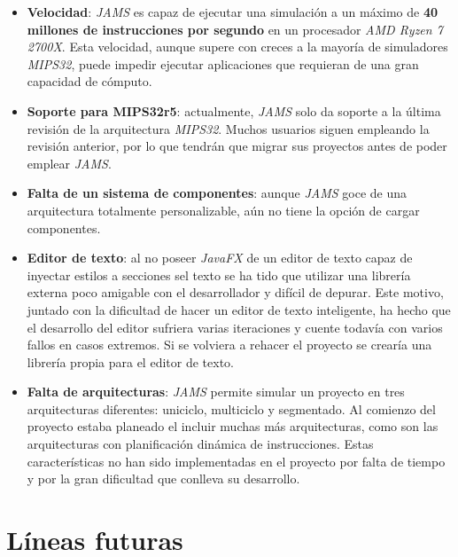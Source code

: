 \begin{itemize}
    \item \textbf{Velocidad}: \textit{JAMS} es capaz de ejecutar
    una simulación a un máximo de \textbf{40 millones de instrucciones por segundo} en un
    procesador \textit{AMD Ryzen 7 2700X}.
    Esta velocidad, aunque supere con creces a la mayoría de simuladores \textit{MIPS32},
    puede impedir ejecutar aplicaciones que requieran de una gran capacidad de cómputo.
    \item \textbf{Soporte para MIPS32r5}: actualmente, \textit{JAMS} solo da soporte
    a la última revisión de la arquitectura \textit{MIPS32}.
    Muchos usuarios siguen empleando la revisión anterior, por lo que tendrán que migrar
    sus proyectos antes de poder emplear \textit{JAMS}.
    \item \textbf{Falta de un sistema de componentes}: aunque \textit{JAMS}
    goce de una arquitectura totalmente personalizable,
    aún no tiene la opción de cargar componentes.
    \item \textbf{Editor de texto}: al no poseer \textit{JavaFX} de un editor
    de texto capaz de inyectar estilos a secciones sel texto se ha tido que
    utilizar una librería externa poco amigable con el desarrollador y difícil
    de depurar.
    Este motivo, juntado con la dificultad de hacer un editor de texto inteligente,
    ha hecho que el desarrollo del editor sufriera varias iteraciones y
    cuente todavía con varios fallos en casos extremos.
    Si se volviera a rehacer el proyecto se crearía una librería propia para
    el editor de texto.
    \item \textbf{Falta de arquitecturas}: \textit{JAMS} permite simular
    un proyecto en tres arquitecturas diferentes: uniciclo, multiciclo y segmentado.
    Al comienzo del proyecto estaba planeado el incluir muchas más arquitecturas,
    como son las arquitecturas con planificación dinámica de instrucciones.
    Estas características no han sido implementadas en el proyecto por
    falta de tiempo y por la gran dificultad que conlleva su desarrollo.
\end{itemize}

\section{Líneas futuras}\label{sec:líneas-futuras}

